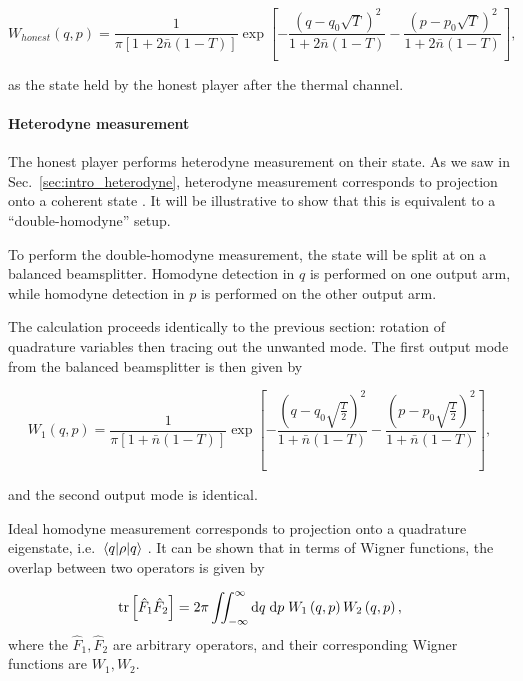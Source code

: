 \begin{equation}
W_{honest}\left(q, p\right) = \frac{1}{\pi \left[ 1 + 2 \bar{n} \left(1-T\right)\right]} \exp\left[ - \frac{\left(q - q_0 \sqrt{T}\right)^2}{1 + 2 \bar{n}\left(1-T\right)} - \frac{\left(p - p_0 \sqrt{T}\right)^2}{1 + 2 \bar{n} \left(1-T\right)} \right],
\end{equation}

\noindent as the state held by the honest player after the thermal channel.

\paragraph{Heterodyne measurement}

The honest player performs heterodyne measurement on their state. As we saw in Sec.~\ref{sec:intro_heterodyne}, heterodyne measurement corresponds to projection onto a coherent state \cite{Serafini2017, Weedbrook2012}. It will be illustrative to show that this is equivalent to a ``double-homodyne'' setup.

To perform the double-homodyne measurement, the state will be split at on a balanced beamsplitter. Homodyne detection in $q$ is performed on one output arm, while homodyne detection in $p$ is performed on the other output arm.

The calculation proceeds identically to the previous section: rotation of quadrature variables then tracing out the unwanted mode. The first output mode from the balanced beamsplitter is then given by

\begin{equation}
W_1\left(q, p\right) =  \frac{1}{\pi \left[ 1 + \bar{n}\left(1-T\right)\right]} \exp\left[- \frac{\left(q - q_0 \sqrt{\frac{T}{2}}\right)^2}{1 + \bar{n}\left(1-T\right)} - \frac{\left(p - p_0 \sqrt{\frac{T}{2}}\right)^2}{1 + \bar{n}\left(1-T\right)} \right],
\end{equation}

\noindent and the second output mode is identical.

Ideal homodyne measurement corresponds to projection onto a quadrature eigenstate, i.e. $\mel{q}{\rho}{q}$ \cite{Weedbrook2012, Serafini2017}. It can be shown \cite{Leonhardt2010} that in terms of Wigner functions, the overlap between two operators is given by

\begin{equation}
\tr\left[\hat{F}_1 \hat{F}_2 \right] = 2 \pi \iint_{-\infty}^\infty \mathrm{d}q \; \mathrm{d}p \; W_1\left(q, p\right) W_2\left(q, p\right),
\end{equation}
where the $\hat{F}_1, \hat{F}_2$ are arbitrary operators, and their corresponding Wigner functions are $W_1, W_2$.

